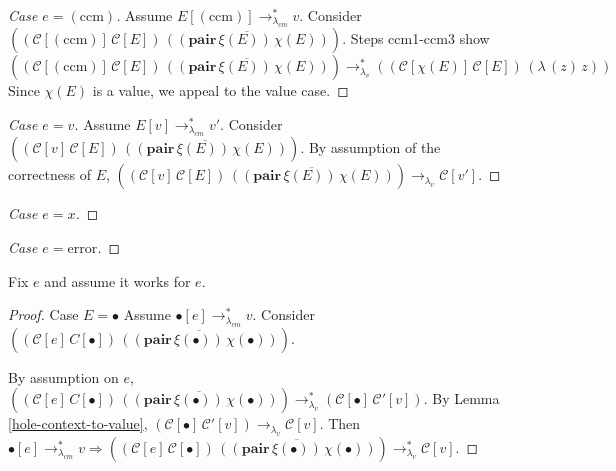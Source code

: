 \documentclass[ms,electronic,twosidetoc,letterpaper,chaptercenter,parttop]{byumsphd}
\begin{document}
\begin{proof}[Case $e=(\mathrm{ccm})$]
Assume $E[(\mathrm{ccm})]\rightarrow_{\lambda_{cm}}^{*}v$. Consider $((\mathcal{C}[(\mathrm{ccm})]\,\mathcal{C}[E])\,\overline{((\mathbf{pair}\,\xi(E))\,\chi(E))})$.
Steps ccm1-ccm3 show
\[
((\mathcal{C}[(\mathrm{ccm})]\,\mathcal{C}[E])\,\overline{((\mathbf{pair}\,\xi(E))\,\chi(E))})\rightarrow_{\lambda_v}^{*}((\mathcal{C}[\chi(E)]\,\mathcal{C}[E])\,(\lambda\,(z)\,z))
\]
Since $\chi(E)$ is a value, we appeal to the value case.
\end{proof}

\begin{proof}[Case $e=v$]
Assume $E[v]\rightarrow_{\lambda_{cm}}^{*}v'$. Consider $((\mathcal{C}[v]\,\mathcal{C}[E])\,\overline{((\mathbf{pair}\,\xi(E))\,\chi(E))})$.
By assumption of the correctness of $E$, $((\mathcal{C}[v]\,\mathcal{C}[E])\,\overline{((\mathbf{pair}\,\xi(E))\,\chi(E))})\rightarrow_{\lambda_v}\mathcal{C}[v']$.
\end{proof}

\begin{proof}[Case $e=x$]
\end{proof}

\begin{proof}[Case $e=\mathrm{error}$]
\end{proof}

Fix $e$ and assume it works for $e$.

\begin{proof}{Case $E=\bullet$}
Assume $\bullet[e]\rightarrow_{\lambda_{cm}}^{*}v$. Consider $((\mathcal{C}[e]\,C[\bullet])\,\overline{((\mathbf{pair}\,\xi(\bullet))\,\chi(\bullet))})$.

By assumption on $e$, $((\mathcal{C}[e]\,C[\bullet])\,\overline{((\mathbf{pair}\,\xi(\bullet))\,\chi(\bullet))})\rightarrow_{\lambda_v}^{*}(\mathcal{C}[\bullet]\,\mathcal{C}'[v])$.
By Lemma \ref{hole-context-to-value}, $(\mathcal{C}[\bullet]\,\mathcal{C}'[v])\rightarrow_{\lambda_v}\mathcal{C}[v]$.
Then $\bullet[e]\rightarrow_{\lambda_{cm}}^{*}v\Rightarrow((\mathcal{C}[e]\,\mathcal{C}[\bullet])\,\overline{((\mathbf{pair}\,\xi(\bullet))\,\chi(\bullet))})\rightarrow_{\lambda_v}^{*}\mathcal{C}[v]$.
\end{proof}
\end{document}
